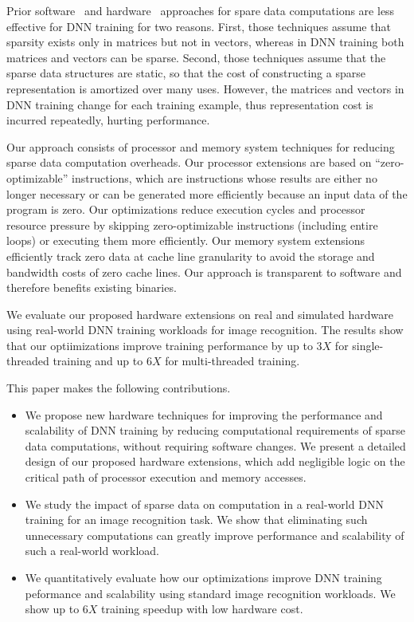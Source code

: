 Prior software~\cite{Eisenstat82, IntelSparseMatrix} and hardware~\cite{Carter99, Srinidhi12, Fowers13} approaches for spare data computations are less effective for DNN training for two reasons.  First, those techniques assume that sparsity exists only in matrices but not in vectors, whereas in DNN training both matrices and vectors can be sparse.  Second, those techniques assume that the sparse data structures are static, so that the cost of constructing a sparse representation is amortized over many uses.  However, the matrices and vectors in DNN training change for each training example, thus representation cost is incurred repeatedly, hurting performance. 

Our approach consists of processor and memory system techniques for reducing sparse data computation overheads.  Our processor extensions are based on ``zero-optimizable'' instructions, which are instructions whose results are either no longer necessary or can be generated more efficiently because an input data of the program is zero.  Our optimizations reduce execution cycles and processor resource pressure by skipping zero-optimizable instructions (including entire loops) or executing them more efficiently.  Our memory system extensions efficiently track zero data at cache line granularity to avoid the storage and bandwidth costs of zero cache lines.  Our approach is transparent to software and therefore benefits existing binaries. 

We evaluate our proposed hardware extensions on real and simulated hardware using real-world DNN training workloads for image recognition. The results show that our optiimizations improve training performance by up to $3X$ for single-threaded training and up to $6X$ for multi-threaded training. 

This paper makes the following contributions.
\begin{itemize}

\item We propose new hardware techniques for improving the performance and scalability of DNN training by reducing computational requirements of sparse data computations, without requiring software changes.  We present a detailed design of our proposed hardware extensions, which add negligible logic on the critical path of processor execution and memory accesses. 
\item We study the impact of sparse data on computation in a real-world DNN training for an image recognition task. We show that eliminating such unnecessary computations can greatly improve performance and scalability of such a real-world workload.
\item We quantitatively evaluate how our optimizations improve DNN training peformance and scalability using standard image recognition workloads. We show up to $6X$ training speedup with low hardware cost. 

\end{itemize}

